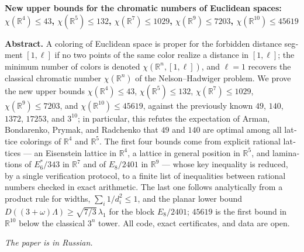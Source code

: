 \documentclass[11pt]{article}
\theoremstyle{definition}
\theoremstyle{remark}
\newcommand{\R}{\mathbb{R}}
\begin{document}
\begin{otherlanguage}{english}
\begin{center}
{\bfseries New upper bounds for the chromatic numbers of Euclidean spaces:\\
$\chi(\R^4)\le43$, $\chi(\R^5)\le132$, $\chi(\R^7)\le1029$,
$\chi(\R^9)\le7203$, $\chi(\R^{10})\le45619$}
\end{center}

\noindent\textbf{Abstract.}
A coloring of Euclidean space is proper for the forbidden distance segment
$[1,\ell]$ if no two points of the same color realize a distance in
$[1,\ell]$; the minimum number of colors is denoted $\chi(\R^n,[1,\ell])$,
and $\ell=1$ recovers the classical chromatic number $\chi(\R^n)$ of the
Nelson--Hadwiger problem. We prove the new upper bounds
$\chi(\R^4)\le43$, $\chi(\R^5)\le132$, $\chi(\R^7)\le1029$,
$\chi(\R^9)\le7203$, and $\chi(\R^{10})\le45619$, against the previously
known $49$, $140$, $1372$, $17253$, and $3^{10}$; in particular, this refutes
the expectation of Arman, Bondarenko, Prymak, and Radchenko that $49$ and
$140$ are optimal among all lattice colorings of $\R^4$ and $\R^5$. The
first four bounds come from explicit rational lattices --- an Eisenstein
lattice in $\R^4$, a lattice in general position in $\R^5$, and laminations
of $E_6^*/343$ in $\R^7$ and of $E_8/2401$ in $\R^9$ --- whose key inequality
is reduced, by a single verification protocol, to a finite list of
inequalities between rational numbers checked in exact arithmetic. The last
one follows analytically from a product rule for widths, $\sum_i1/d_i^2\le1$, and the planar lower bound
$D((3+\omega)\Lambda)\ge\sqrt{7/3}\,\lambda_1$ for the block $E_8/2401$;
$45619$ is the first bound in $\R^{10}$ below the classical $3^n$ tower.
All code, exact certificates, and data are open.

\smallskip
\noindent\emph{The paper is in Russian.}
\end{otherlanguage}







\end{document}
